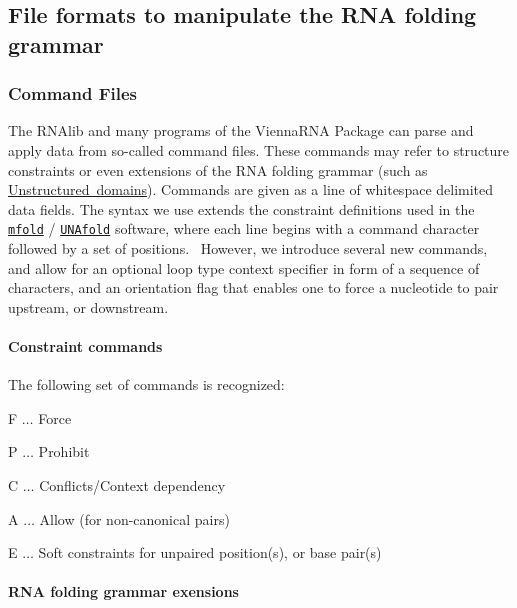 \hypertarget{file_formats_constraint-formats}{}\subsection{File formats to manipulate the R\+N\+A folding grammar}\label{file_formats_constraint-formats}
\hypertarget{file_formats_constraint-formats-file}{}\subsubsection{Command Files}\label{file_formats_constraint-formats-file}
The R\+N\+Alib and many programs of the Vienna\+R\+NA Package can parse and apply data from so-\/called command files. These commands may refer to structure constraints or even extensions of the R\+NA folding grammar (such as \mbox{\hyperlink{group__domains__up}{Unstructured domains}}). Commands are given as a line of whitespace delimited data fields. The syntax we use extends the constraint definitions used in the \href{http://mfold.rna.albany.edu/?q=mfold}{\tt mfold} / \href{http://mfold.rna.albany.edu/?q=DINAMelt/software}{\tt U\+N\+Afold} software, where each line begins with a command character followed by a set of positions.~\newline
However, we introduce several new commands, and allow for an optional loop type context specifier in form of a sequence of characters, and an orientation flag that enables one to force a nucleotide to pair upstream, or downstream.\hypertarget{file_formats_constraint_commands}{}\paragraph{Constraint commands}\label{file_formats_constraint_commands}
The following set of commands is recognized\+:
\begin{DoxyItemize}
\item {\ttfamily F} $ \ldots $ Force
\item {\ttfamily P} $ \ldots $ Prohibit
\item {\ttfamily C} $ \ldots $ Conflicts/\+Context dependency
\item {\ttfamily A} $ \ldots $ Allow (for non-\/canonical pairs)
\item {\ttfamily E} $ \ldots $ Soft constraints for unpaired position(s), or base pair(s)
\end{DoxyItemize}\hypertarget{file_formats_domain_commands}{}\paragraph{R\+N\+A folding grammar exensions}\label{file_formats_domain_commands}

